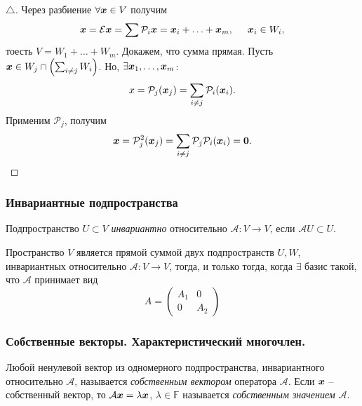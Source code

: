 \begin{proof}[$\triangle$]
    Через разбиение $\forall \mbox{\boldmath $x$} \in V $ получим
$$
    \mbox{\boldmath $x$} = \mathcal E \mbox{\boldmath $x$} = \sum \mathcal P_i \mbox{\boldmath $x$} = \mbox{\boldmath $x$}_i + \ldots + \mbox{\boldmath $x$}_m, \hspace{0.5cm} \mbox{\boldmath $x$}_i \in W_i,
$$
тоесть $V = W_1 + \ldots + W_m$. Докажем, что сумма прямая. Пусть $\mbox{\boldmath $x$} \in W_j \cap \left(\sum_{i \neq j} W_i\right) $. Но, $\exists \mbox{\boldmath $x$}_1, \ldots, \mbox{\boldmath $x$}_m $:
$$
    x = \mathcal P_j (\mbox{\boldmath $x$}_j) = \sum_{i \neq j} \mathcal P_i (\mbox{\boldmath $x$}_i).
$$
Применим $\mathcal P_j $, получим
$$
    \mbox{\boldmath $x$} = \mathcal P_j^2 (\mbox{\boldmath $x$}_j) = \sum_{i \neq j} \mathcal P_j \mathcal P_i (\mbox{\boldmath $x$}_i) = \mbox{\boldmath $0$}.
$$
\end{proof}



\subsubsection{Инвариантные подпространства}

\begin{to_def} 
    Подпространство $U \subset V $ \textit{инвариантно} относительно $\mathcal A \colon V \to V$, если $\mathcal A U \subset U $. 
\end{to_def}

\begin{to_thr} 
    Пространство $V $ является прямой суммой двух подпространств $U, W $, инвариантных относительно $\mathcal A \colon V \to V $, тогда, и только тогда, когда $\exists $ базис такой, что $\mathcal A $ принимает вид
$$
    A = \begin{pmatrix}
        A_1 & 0 \\
        0 & A_2
    \end{pmatrix}
$$
\end{to_thr}


\subsubsection{Собственные векторы. Характеристический многочлен.}

\begin{to_def} 
    Любой ненулевой вектор из одномерного подпространства, инвариантного относительно $\mathcal A $, называется \textit{собственным вектором} оператора $\mathcal A $. Если $\mbox{\boldmath $x$} $ -- собственный вектор, то $\mathcal A \mbox{\boldmath $x$} = \lambda \mbox{\boldmath $x$} $, $\lambda \in \mathbb{F} $ называется \textit{собственным значением} $\mathcal A $. 
\end{to_def}

